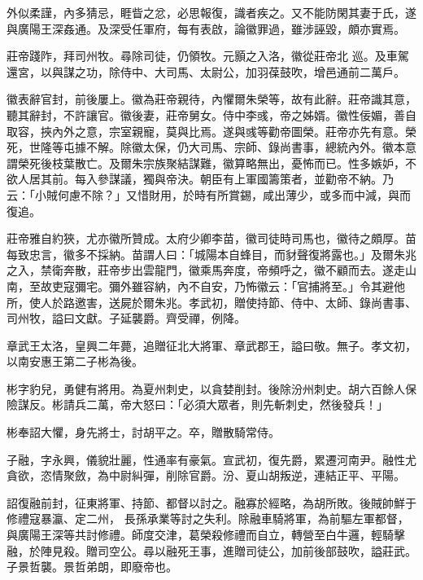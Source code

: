 \begin{pinyinscope}
 外似柔謹，內多猜忌，睚眥之忿，必思報復，識者疾之。又不能防閑其妻于氏，遂與廣陽王深姦通。及深受任軍府，每有表啟，論徽罪過，雖涉誣毀，頗亦實焉。



 莊帝踐阼，拜司州牧。尋除司徒，仍領牧。元顥之入洛，徽從莊帝北
 巡。及車駕還宮，以與謀之功，除侍中、大司馬、太尉公，加羽葆鼓吹，增邑通前二萬戶。



 徽表辭官封，前後屢上。徽為莊帝親待，內懼爾朱榮等，故有此辭。莊帝識其意，聽其辭封，不許讓官。徽後妻，莊帝舅女。侍中李彧，帝之姊婿。徽性佞媚，善自取容，挾內外之意，宗室親寵，莫與比焉。遂與彧等勸帝圖榮。莊帝亦先有意。榮死，世隆等屯據不解。除徽太保，仍大司馬、宗師、錄尚書事，總統內外。徽本意謂榮死後枝葉散亡。及爾朱宗族聚結謀難，徽算略無出，憂怖而已。性多嫉妒，不欲人居其前。每入參謀議，獨與帝決。朝臣有上軍國籌策者，並勸帝不納。乃
 云：「小賊何慮不除？」又惜財用，於時有所賞錫，咸出薄少，或多而中減，與而復追。



 莊帝雅自約狹，尤亦徽所贊成。太府少卿李苗，徽司徒時司馬也，徽待之頗厚。苗每致忠言，徽多不採納。苗謂人曰：「城陽本自蜂目，而豺聲復將露也。」及爾朱兆之入，禁衛奔散，莊帝步出雲龍門，徽乘馬奔度，帝頻呼之，徽不顧而去。遂走山南，至故吏寇彌宅。彌外雖容納，內不自安，乃怖徽云：「官捕將至。」令其避他所，使人於路邀害，送屍於爾朱兆。孝武初，贈使持節、侍中、太師、錄尚書事、司州牧，謚曰文獻。子延襲爵。齊受禪，例降。



 章武王太洛，皇興二年薨，追贈征北大將軍、章武郡王，謚曰敬。無子。孝文初，以南安惠王第二子彬為後。



 彬字豹兒，勇健有將用。為夏州刺史，以貪婪削封。後除汾州刺史。胡六百餘人保險謀反。彬請兵二萬，帝大怒曰：「必須大眾者，則先斬刺史，然後發兵！」



 彬奉詔大懼，身先將士，討胡平之。卒，贈散騎常侍。



 子融，字永興，儀貌壯麗，性通率有豪氣。宣武初，復先爵，累遷河南尹。融性尤貪欲，恣情聚斂，為中尉糾彈，削除官爵。汾、夏山胡叛逆，連結正平、平陽。



 詔復融前封，征東將軍、持節、都督以討之。融寡於經略，為胡所敗。後賊帥鮮于修禮寇暴瀛、定二州，
 長孫承業等討之失利。除融車騎將軍，為前驅左軍都督，與廣陽王深等共討修禮。師度交津，葛榮殺修禮而自立，轉營至白牛邏，輕騎擊融，於陣見殺。贈司空公。尋以融死王事，進贈司徒公，加前後部鼓吹，謚莊武。子景哲襲。景哲弟朗，即廢帝也。




\end{pinyinscope}
